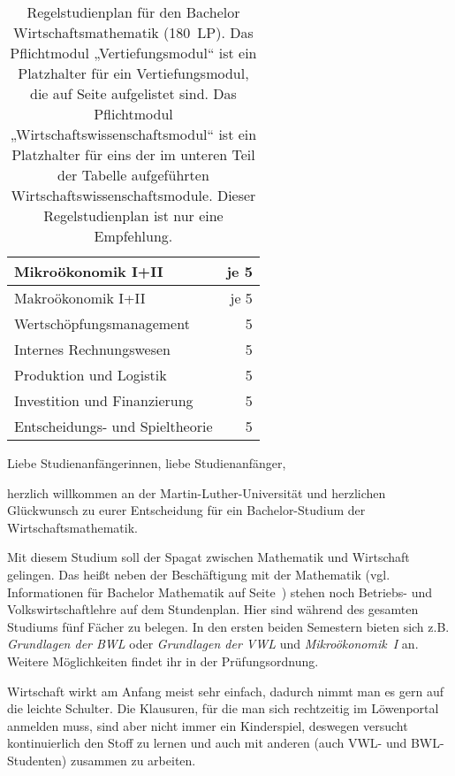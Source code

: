 \begin{table}[tbp]
\begin{small}
\begin{tabularx}{\textwidth}{|X||c|c|c|c|c|c||r|}
			\multicolumn{7}{|X||}{Mikroökonomik I+II}&je 5\\\hline
			\multicolumn{7}{|X||}{Makroökonomik I+II}&je 5\\\hline
			\multicolumn{7}{|X||}{Wertschöpfungsmanagement}&5\\\hline
			\multicolumn{7}{|X||}{Internes Rechnungswesen}&5\\\hline
			\multicolumn{7}{|X||}{Produktion und Logistik}&5\\\hline
			\multicolumn{7}{|X||}{Investition und Finanzierung}&5\\\hline
			\multicolumn{7}{|X||}{Entscheidungs- und Spieltheorie}&5\\\hline
		\end{tabularx}
	\end{small}
	\caption{\label{plan-wima}Regelstudienplan für den Bachelor Wirtschaftsmathematik (180~LP). Das Pflichtmodul „Vertiefungsmodul“ ist ein Platzhalter für ein Vertiefungsmodul, die auf Seite \pageref{studiengang_mathematik} aufgelistet sind. Das Pflichtmodul „Wirtschaftswissenschaftsmodul“ ist ein Platzhalter für eins der im unteren Teil der Tabelle aufgeführten Wirtschaftswissenschaftsmodule. Dieser Regelstudienplan ist nur eine Empfehlung.}
\end{table}

Liebe Studienanfängerinnen, liebe Studienanfänger,\par

herzlich willkommen an der Martin-Luther-Universität und herzlichen Glückwunsch zu eurer Entscheidung für ein Bachelor-Studium der Wirtschaftsmathematik.

Mit diesem Studium soll der Spagat zwischen Mathematik und Wirtschaft gelingen.
Das heißt neben der Beschäftigung mit der Mathematik (vgl. Informationen für Bachelor Mathematik auf Seite~\pageref{studiengang_mathematik}) stehen noch Betriebs- und Volkswirtschaftlehre auf dem Stundenplan.
Hier sind während des gesamten Studiums fünf Fächer zu belegen.
In den ersten beiden Semestern bieten sich z.B. \textit{Grundlagen der BWL} oder \textit{Grundlagen der VWL} und \textit{Mikroökonomik~I} an.
Weitere Möglichkeiten findet ihr in der Prüfungsordnung.

Wirtschaft wirkt am Anfang meist sehr einfach, dadurch nimmt man es gern auf die leichte Schulter.
Die Klausuren, für die man sich rechtzeitig im Löwenportal anmelden muss, sind aber nicht immer ein Kinderspiel, deswegen versucht kontinuierlich den Stoff zu lernen und auch mit anderen (auch VWL- und BWL-Studenten) zusammen zu arbeiten.

